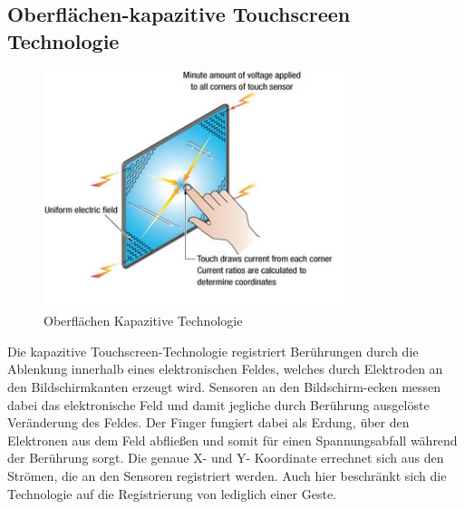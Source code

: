 \documentclass[12pt,oneside,a4paper,bibtotoc,liststotoc]{scrreprt}
\begin{document}
\subsection{Oberflächen-kapazitive Touchscreen Technologie}
\begin{figure}[H]
  \begin{centering}
    \includegraphics[width=0.8\textwidth]{img/oberflaechen_kapazitiv.png}
    \caption{Oberflächen Kapazitive Technologie}
    \label{oberflächen_kapazitiv}
  \end{centering}
\end{figure}
Die kapazitive Touchscreen-Technologie registriert Berührungen durch die Ablenkung innerhalb eines elektronischen Feldes, welches durch Elektroden an den Bildschirmkanten erzeugt wird. Sensoren an den Bildschirm-ecken messen dabei das elektronische Feld und damit jegliche durch Berührung ausgelöste Veränderung des Feldes. Der Finger fungiert dabei als Erdung, über den Elektronen aus dem Feld abfließen und somit für einen Spannungsabfall während der Berührung sorgt. Die genaue X- und Y- Koordinate errechnet sich aus den Strömen, die an den Sensoren registriert werden. Auch hier beschränkt sich die Technologie auf die Registrierung von lediglich einer Geste.
\end{document}
